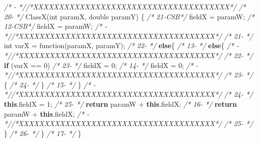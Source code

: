 \documentclass[
]{article}
\newenvironment{Shaded}{\begin{snugshade}}{\end{snugshade}}
\newcommand{\CommentTok}[1]{\textcolor[rgb]{0.56,0.35,0.01}{\textit{#1}}}
\newcommand{\DataTypeTok}[1]{\textcolor[rgb]{0.13,0.29,0.53}{#1}}
\newcommand{\DecValTok}[1]{\textcolor[rgb]{0.00,0.00,0.81}{#1}}
\newcommand{\FunctionTok}[1]{\textcolor[rgb]{0.00,0.00,0.00}{#1}}
\newcommand{\KeywordTok}[1]{\textcolor[rgb]{0.13,0.29,0.53}{\textbf{#1}}}
\newcommand{\NormalTok}[1]{#1}
\begin{document}
\begin{landscape}
\begin{Shaded}
\begin{Highlighting}[]
\CommentTok{/*   -   *//*XXXXXXXXXXXXXXXXXXXXXXXXXXXXXXXXXXXXXX*/}               \CommentTok{/* 20-   */}    \FunctionTok{ClassX}\NormalTok{(}\DataTypeTok{int}\NormalTok{ paramX, }\DataTypeTok{double}\NormalTok{ paramY) \{                        }
\CommentTok{/* 21-CSB*/}\NormalTok{            fieldX = paramW;                             }\CommentTok{/* 12-CSB*/}\NormalTok{            fieldX = paramW;                             }
\CommentTok{/*   -   *//*XXXXXXXXXXXXXXXXXXXXXXXXXXXXXXXXXXXXXX*/}               \CommentTok{/* 21-   */}        \DataTypeTok{int}\NormalTok{ varX = }\FunctionTok{function}\NormalTok{(paramX, paramY);                  }
\CommentTok{/* 22-   */}        \KeywordTok{else}\NormalTok{\{                                            }\CommentTok{/* 13-   */}        \KeywordTok{else}\NormalTok{\{                                            }
\CommentTok{/*   -   *//*XXXXXXXXXXXXXXXXXXXXXXXXXXXXXXXXXXXXXX*/}               \CommentTok{/* 22-   */}        \KeywordTok{if}\NormalTok{ (varX == }\DecValTok{0}\NormalTok{)                                   }
\CommentTok{/* 23-   */}\NormalTok{            fieldX = }\DecValTok{0}\NormalTok{;                                  }\CommentTok{/* 14-   */}\NormalTok{            fieldX = }\DecValTok{0}\NormalTok{;                                  }
\CommentTok{/*   -   *//*XXXXXXXXXXXXXXXXXXXXXXXXXXXXXXXXXXXXXX*/}               \CommentTok{/* 23-   */}\NormalTok{        \{                                                }
\CommentTok{/* 24-   */}\NormalTok{        \}                                                }\CommentTok{/* 15-   */}\NormalTok{        \}                                                }
\CommentTok{/*   -   *//*XXXXXXXXXXXXXXXXXXXXXXXXXXXXXXXXXXXXXX*/}               \CommentTok{/* 24-   */}            \KeywordTok{this}\NormalTok{.}\FunctionTok{fieldX}\NormalTok{ = }\DecValTok{1}\NormalTok{;                             }
\CommentTok{/* 25-   */}        \KeywordTok{return}\NormalTok{ paramW + }\KeywordTok{this}\NormalTok{.}\FunctionTok{fieldX}\NormalTok{;                     }\CommentTok{/* 16-   */}        \KeywordTok{return}\NormalTok{ paramW + }\KeywordTok{this}\NormalTok{.}\FunctionTok{fieldX}\NormalTok{;                     }
\CommentTok{/*   -   *//*XXXXXXXXXXXXXXXXXXXXXXXXXXXXXXXXXXXXXX*/}               \CommentTok{/* 25-   */}\NormalTok{        \}                                                            }
\CommentTok{/* 26-   */}\NormalTok{     \}                                                   }\CommentTok{/* 17-   */}\NormalTok{     \}                                                   }

\end{Highlighting}
\end{Shaded}
\end{landscape}
\end{document}
